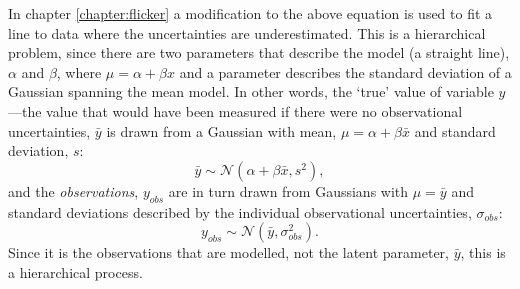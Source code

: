 In chapter \ref{chapter:flicker} a modification to the above equation is used
to fit a line to data where the uncertainties are underestimated.
This is a hierarchical problem, since there are two parameters that describe
the model (a straight line), $\alpha$ and $\beta$, where $\mu = \alpha +
\beta x$ and a parameter describes the standard deviation of a Gaussian
spanning the mean model.
In other words, the `true' value of variable $y$---the value that would have
been measured if there were no observational uncertainties, $\bar{y}$ is drawn
from a Gaussian with mean, $\mu = \alpha + \beta \bar{x}$ and standard
deviation, $s$:
\begin{equation}
\bar{y} \sim \mathcal{N}(\alpha + \beta\bar{x}, s^2),
\end{equation}
and the {\it observations}, $y_{obs}$ are in turn drawn from Gaussians with
$\mu = \bar{y}$ and standard deviations described by the individual
observational uncertainties, $\sigma_{obs}$:
\begin{equation}
y_{obs} \sim \mathcal{N}(\bar{y}, \sigma_{obs}^2).
\end{equation}
Since it is the observations that are modelled, not the latent parameter,
$\bar{y}$, this is a hierarchical process.

